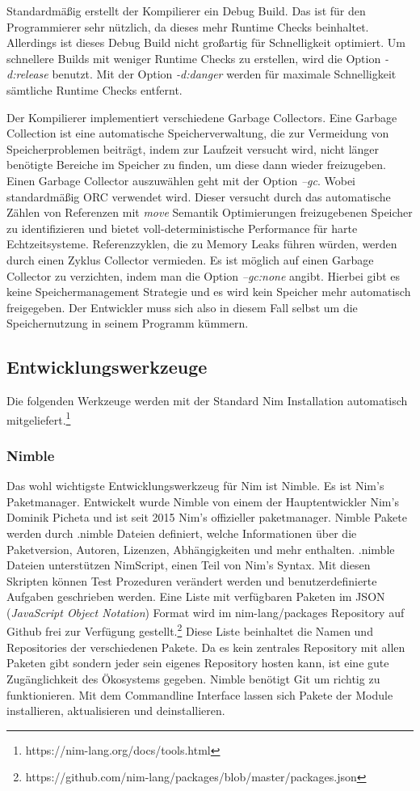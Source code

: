 \documentclass[11pt]{report}
\begin{document}
Standardmäßig erstellt der Kompilierer ein Debug Build. Das ist für den Programmierer sehr nützlich, da dieses mehr Runtime Checks beinhaltet. Allerdings ist dieses Debug Build nicht großartig für Schnelligkeit optimiert. Um schnellere Builds mit weniger Runtime Checks zu erstellen, wird die Option \emph{-d:release} benutzt. Mit der Option \emph{-d:danger} werden für maximale Schnelligkeit sämtliche Runtime Checks entfernt.

Der Kompilierer implementiert verschiedene Garbage Collectors. Eine Garbage Collection ist eine automatische Speicherverwaltung, die zur Vermeidung von Speicherproblemen beiträgt, indem zur Laufzeit versucht wird, nicht länger benötigte Bereiche im Speicher zu finden, um diese dann wieder freizugeben.
Einen Garbage Collector auszuwählen geht mit der Option \emph{--gc}. Wobei standardmäßig ORC verwendet wird. Dieser versucht durch das automatische Zählen von Referenzen mit \emph{move} Semantik Optimierungen freizugebenen Speicher zu identifizieren und bietet voll-deterministische Performance für harte Echtzeitsysteme. Referenzzyklen, die zu Memory Leaks führen würden, werden durch einen Zyklus Collector vermieden.
Es ist möglich auf einen Garbage Collector zu verzichten, indem man die Option \emph{--gc:none} angibt. Hierbei gibt es keine Speichermanagement Strategie und es wird kein Speicher mehr automatisch freigegeben. Der Entwickler muss sich also in diesem Fall selbst um die Speichernutzung in seinem Programm kümmern.

\subsection{Entwicklungswerkzeuge}
Die folgenden Werkzeuge werden mit der Standard Nim Installation automatisch mitgeliefert.\footnote{https://nim-lang.org/docs/tools.html}

\subsubsection{Nimble}
Das wohl wichtigste Entwicklungswerkzeug für Nim ist Nimble. Es ist Nim's Paketmanager. Entwickelt wurde Nimble von einem der Hauptentwickler Nim's Dominik Picheta und ist seit 2015 Nim's offizieller paketmanager. Nimble Pakete werden durch .nimble Dateien definiert, welche Informationen über die Paketversion, Autoren, Lizenzen, Abhängigkeiten und mehr enthalten.
.nimble Dateien unterstützen NimScript, einen Teil von Nim's Syntax. Mit diesen Skripten können Test Prozeduren verändert werden und benutzerdefinierte Aufgaben geschrieben werden.
Eine Liste mit verfügbaren Paketen im JSON (\emph{JavaScript Object Notation}) Format wird im nim-lang/packages Repository auf Github frei zur Verfügung gestellt.\footnote{https://github.com/nim-lang/packages/blob/master/packages.json} Diese Liste beinhaltet die Namen und Repositories der verschiedenen Pakete. Da es kein zentrales Repository mit allen Paketen gibt sondern jeder sein eigenes Repository hosten kann, ist eine gute Zugänglichkeit des Ökosystems gegeben.
Nimble benötigt Git um richtig zu funktionieren. Mit dem Commandline Interface lassen sich Pakete der Module installieren, aktualisieren und deinstallieren.
\end{document}
